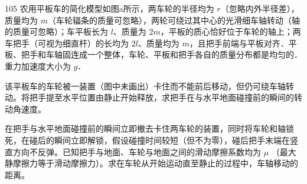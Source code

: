 \begin{problem}[2019年第36届全国中学生物理竞赛复赛][农用平板车简化模型]{105}
农用平板车的简化模型如图a所示，两车轮的半径均为 $r$（忽略内外半径差），质量均为 $m$（车轮辐条的质量可忽略），两轮可绕过其中心的光滑细车轴转动（轴的质量可忽略）；车平板长为 $l$、质量为 $2m$，平板的质心恰好位于车轮的轴上；两车把手（可视为细直杆）的长均为 $2l$、质量均为 $m$，且把手前端与平板对齐．平板、把手和车轴固连成一个整体，车轮、平板和把手各自的质量分布都是均匀的．重力加速度大小为 $g$．
\begin{subproblem}
该平板车的车轮被一装置（图中未画出）卡住而不能前后移动，但仍可绕车轴转动。将把手提至水平位置由静止开始释放，求把手在与水平地面碰撞前的瞬间的转动角速度。
\end{subproblem}
\begin{subproblem}
在把手与水平地面碰撞前的瞬间立即撤去卡住两车轮的装置，同时将车轮和轴锁死，在碰后的瞬间立即解锁，假设碰撞时间较短（但不为零），碰后把手末端在竖直方向不反弹。已知把手与地面、车轮与地面之间的滑动摩擦系数均为 $\mu$ （最大静摩擦力等于滑动摩擦力）。求在车轮从开始运动直至静止的过程中，车轴移动的距离。
\end{subproblem}
\end{problem}